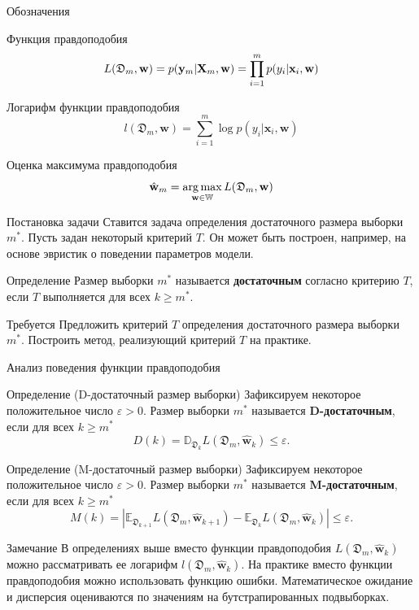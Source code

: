 \documentclass[10pt]{beamer}
\begin{document}
\begin{frame}{Обозначения}
    \begin{block}{Функция правдоподобия}
        \[ L(\mathfrak{D}_m, \mathbf{w}) = p(\mathbf{y}_m | \mathbf{X}_m, \mathbf{w}) = \prod_{i=1}^{m} p(y_i | \mathbf{x}_i, \mathbf{w}) \]
    \end{block}
    \vfill
    \begin{block}{Логарифм функции правдоподобия}
        \[ l(\mathfrak{D}_m, \mathbf{w}) = \sum\limits_{i=1}^{m} \log p(y_i | \mathbf{x}_i, \mathbf{w}) \]
    \end{block}
    \vfill
    \begin{block}{Оценка максимума правдоподобия}
        \[ \hat{\mathbf{w}}_{m} = \operatorname*{arg\,max}_{\mathbf{w} \in \mathbb{W}} L(\mathfrak{D}_m, \mathbf{w}) \]
    \end{block}
\end{frame}
\begin{frame}{Постановка задачи}
    Ставится задача определения достаточного размера выборки $m^*$. Пусть задан некоторый критерий $T$. Он может быть построен, например, на основе эвристик о поведении параметров модели.
    \vfill
    \begin{block}{Определение}
        Размер выборки $m^*$ называется \textbf{достаточным} согласно критерию $T$, если $T$ выполняется для всех $k \geqslant m^*$.
    \end{block}
    \vfill
    \begin{alertblock}{Требуется}
        Предложить критерий $T$ определения достаточного размера выборки $m^*$.
        Построить метод, реализующий критерий $T$ на практике.
    \end{alertblock}
\end{frame}
\begin{frame}{Анализ поведения функции правдоподобия}
    \begin{block}{Определение (D-достаточный размер выборки)}
        Зафиксируем некоторое положительное число $\varepsilon > 0$. Размер выборки $m^*$ называется \textbf{D-достаточным}, если для всех $k \geqslant m^*$
        \[ D(k) = \mathbb{D}_{\mathfrak{D}_k} L(\mathfrak{D}_m, \hat{\mathbf{w}}_{k}) \leqslant \varepsilon. \]
    \end{block}
    \vfill
    \begin{block}{Определение (M-достаточный размер выборки)}
        Зафиксируем некоторое положительное число $\varepsilon > 0$. Размер выборки $m^*$ называется \textbf{M-достаточным}, если для всех $k \geqslant m^*$ 
        \[ M(k) = \left| \mathbb{E}_{\mathfrak{D}_{k+1}} L(\mathfrak{D}_m, \hat{\mathbf{w}}_{k+1}) - \mathbb{E}_{\mathfrak{D}_k} L(\mathfrak{D}_m, \hat{\mathbf{w}}_{k}) \right| \leqslant \varepsilon. \]
    \end{block}
    \vfill
    \begin{block}{Замечание}
        В определениях выше вместо функции правдоподобия $L(\mathfrak{D}_m, \hat{\mathbf{w}}_{k})$ можно рассматривать ее логарифм $l(\mathfrak{D}_m, \hat{\mathbf{w}}_{k})$. На практике вместо функции правдоподобия можно использовать функцию ошибки. Математическое ожидание и дисперсия оцениваются по значениям на бутстрапированных подвыборках.
    \end{block}
\end{frame}
\end{document}
